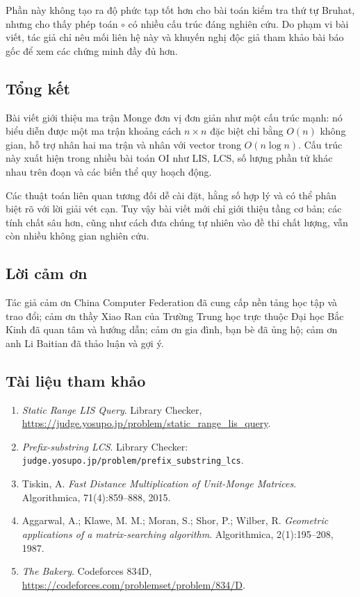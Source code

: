 \documentclass[11pt]{article}
\begin{document}
Phần này không tạo ra độ phức tạp tốt hơn cho bài toán kiểm tra thứ tự Bruhat,
nhưng cho thấy phép toán $\circ$ có nhiều cấu trúc đáng nghiên cứu. Do phạm vi
bài viết, tác giả chỉ nêu mối liên hệ này và khuyến nghị độc giả tham khảo bài
báo gốc để xem các chứng minh đầy đủ hơn.

\subsection{Tổng kết}

Bài viết giới thiệu ma trận Monge đơn vị đơn giản như một cấu trúc mạnh: nó biểu
diễn được một ma trận khoảng cách $n\times n$ đặc biệt chỉ bằng $O(n)$ không
gian, hỗ trợ nhân hai ma trận và nhân với vector trong $O(n\log n)$. Cấu trúc
này xuất hiện trong nhiều bài toán OI như LIS, LCS, số lượng phần tử khác nhau
trên đoạn và các biến thể quy hoạch động.

Các thuật toán liên quan tương đối dễ cài đặt, hằng số hợp lý và có thể phân
biệt rõ với lời giải vét cạn. Tuy vậy bài viết mới chỉ giới thiệu tầng cơ bản;
các tính chất sâu hơn, cũng như cách đưa chúng tự nhiên vào đề thi chất lượng,
vẫn còn nhiều không gian nghiên cứu.

\subsection*{Lời cảm ơn}

Tác giả cảm ơn China Computer Federation đã cung cấp nền tảng học tập và trao
đổi; cảm ơn thầy Xiao Ran của Trường Trung học trực thuộc Đại học Bắc Kinh đã
quan tâm và hướng dẫn; cảm ơn gia đình, bạn bè đã ủng hộ; cảm ơn anh Li Baitian
đã thảo luận và gợi ý.

\subsection*{Tài liệu tham khảo}

\begin{enumerate}
  \item \emph{Static Range LIS Query}. Library Checker,
  \url{https://judge.yosupo.jp/problem/static_range_lis_query}.
  \item \emph{Prefix-substring LCS}. Library Checker:
  \texttt{judge.yosupo.jp/problem/prefix\_substring\_lcs}.
  \item Tiskin, A. \emph{Fast Distance Multiplication of Unit-Monge Matrices}.
  Algorithmica, 71(4):859--888, 2015.
  \item Aggarwal, A.; Klawe, M. M.; Moran, S.; Shor, P.; Wilber, R.
  \emph{Geometric applications of a matrix-searching algorithm}. Algorithmica,
  2(1):195--208, 1987.
  \item \emph{The Bakery}. Codeforces 834D,
  \url{https://codeforces.com/problemset/problem/834/D}.
\end{enumerate}
\end{document}
